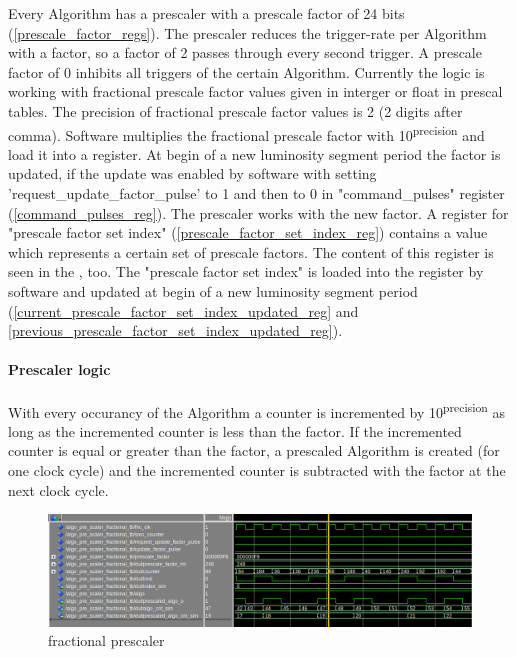 Every Algorithm has a prescaler with a prescale factor of 24 bits (\ref{prescale_factor_regs}). The prescaler reduces the trigger-rate per Algorithm with a factor, so \eg a factor of 2 passes through every second trigger. A prescale factor of 0 inhibits all triggers of the certain Algorithm.
Currently the logic is working with fractional prescale factor values given in interger or float in prescal tables. The precision of fractional prescale factor values is 2 (2 digits after comma). Software multiplies the fractional prescale factor with 10\textsuperscript{\tiny{precision}} and load it into a register.
At begin of a new luminosity segment period the factor is updated, if the update was enabled by software with setting 'request\_update\_factor\_pulse' to 1 and then to 0 in "command\_pulses" register (\ref{command_pulses_reg}). The prescaler works with the new factor.
A register for "prescale factor set index" (\ref{prescale_factor_set_index_reg}) contains a value which represents a certain set of
prescale factors. The content of this register is seen in the \record, too. The "prescale factor set index" is loaded into the register by software and updated at
begin of a new luminosity segment period (\ref{current_prescale_factor_set_index_updated_reg} and \ref{previous_prescale_factor_set_index_updated_reg}).

\paragraph{Prescaler logic}
With every occurancy of the Algorithm a counter is incremented by 10\textsuperscript{\tiny{precision}} as long as the incremented counter is less than the factor.
If the incremented counter is equal or greater than the factor, a prescaled Algorithm is created (for one clock cycle) and the incremented counter is subtracted with the factor at the next clock cycle.

\begin{figure}[htb]
\centering
\includegraphics[width=15cm]{figures/Screenshot_fractional_prescalers}
\caption{fractional prescaler}
\label{fig:fdl:fractional_prescalers}
\end{figure}

